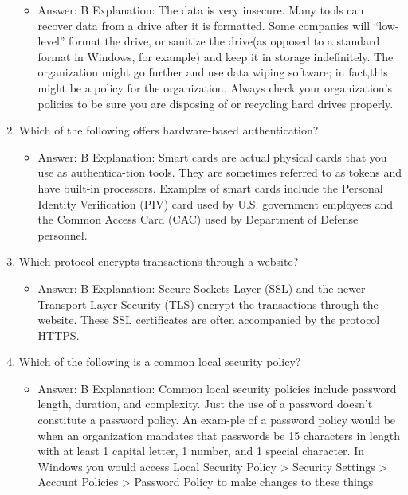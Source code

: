 \documentclass{article}
\begin{document}
\begin{enumerate}
\begin{itemize}
         \item Answer:   B        Explanation:        The data is very insecure. Many tools can recover data from a drive after it is formatted. Some companies will “low-level” format the drive, or sanitize the drive(as opposed to a standard format in Windows, for example) and keep it in storage indefinitely. The organization might go further and use data wiping software; in fact,this might be a policy for the organization. Always check your organization’s policies to be sure you are disposing of or recycling hard drives properly.
     \end{itemize}
     \item Which of the following offers hardware-based authentication?
     \begin{itemize}
         \item Answer:   B                Explanation:        Smart cards are actual physical cards that you use as authentica-tion tools. They are sometimes referred to as tokens and have built-in processors. Examples of smart cards include the Personal Identity Verification (PIV) card used by U.S. government employees and the Common Access Card (CAC) used by Department of Defense personnel.
     \end{itemize}
     \item Which protocol encrypts transactions through a website?
     \begin{itemize}
         \item Answer:   B                Explanation:        Secure Sockets Layer (SSL) and the newer Transport Layer Security (TLS) encrypt the transactions through the website. These SSL certificates are often accompanied by the protocol HTTPS.
     \end{itemize}
     \item Which of the following is a common local security policy?
     \begin{itemize}
         \item Answer:   B                Explanation:        Common local security policies include password length, duration, and complexity. Just the use of a password doesn’t constitute a password policy. An exam-ple of a password policy would be when an organization mandates that passwords be 15 characters in length with at least 1 capital letter, 1 number, and 1 special character. In Windows you would access Local Security Policy > Security Settings > Account Policies > Password Policy to make changes to these things
     \end{itemize}

\end{enumerate}
\end{document}
